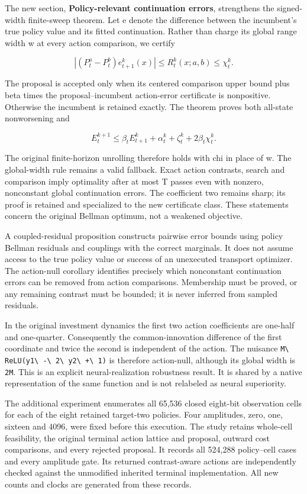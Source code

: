 \documentclass[ecta,nameyear,draft]{econsocart}
\begin{document}
The new section, \textbf{Policy-relevant continuation errors},
strengthens the signed-width finite-sweep theorem. Let e denote the
difference between the incumbent's true policy value and its fitted
continuation. Rather than charge its global range width w at every
action comparison, we certify

\[
 |(P_t^a-P_t^b)e_{t+1}^k(x)|\le R_t^k(x;a,b)\le\chi_t^k.
\]

The proposal is accepted only when its centered comparison upper bound
plus beta times the proposal--incumbent action-error certificate is
nonpositive. Otherwise the incumbent is retained exactly. The theorem
proves both all-state nonworsening and

\[
 E_t^{k+1}\le\beta_t E_{t+1}^k+
 \alpha_t^k+\zeta_t^k+2\beta_t\chi_t^k.
\]

The original finite-horizon unrolling therefore holds with chi in place
of w. The global-width rule remains a valid fallback. Exact action
contrasts, search and comparison imply optimality after at most T passes
even with nonzero, nonconstant global continuation errors. The
coefficient two remains sharp; its proof is retained and specialized to
the new certificate class. These statements concern the original Bellman
optimum, not a weakened objective.

A coupled-residual proposition constructs pairwise error bounds using
policy Bellman residuals and couplings with the correct marginals. It
does not assume access to the true policy value or success of an
unexecuted transport optimizer. The action-null corollary identifies
precisely which nonconstant continuation errors can be removed from
action comparisons. Membership must be proved, or any remaining contrast
must be bounded; it is never inferred from sampled residuals.

In the original investment dynamics the first two action coefficients
are one-half and one-quarter. Consequently the common-innovation
difference of the first coordinate and twice the second is independent
of the action. The nuisance \nolinkurl{M\ ReLU(y1\ -\ 2\ y2\ +\ 1)} is
therefore action-null, although its global width is \nolinkurl{2M}. This is
an explicit neural-realization robustness result. It is shared by a
native representation of the same function and is not relabeled as
neural superiority.

The additional experiment enumerates all 65,536 closed eight-bit
observation cells for each of the eight retained target-two policies.
Four amplitudes, zero, one, sixteen and 4096, were fixed before this
execution. The study retains whole-cell feasibility, the original
terminal action lattice and proposal, outward cost comparisons, and
every rejected proposal. It records all 524,288 policy--cell cases and
every amplitude gate. Its returned contrast-aware actions are
independently checked against the unmodified inherited terminal
implementation. All new counts and clocks are generated from these
records.
\end{document}
